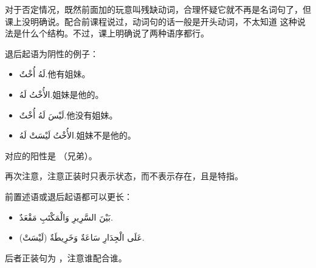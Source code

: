 \begin{note}
    对于否定情况，既然前面加的玩意叫残缺动词，合理怀疑它就不再是名词句了，但课上没明确说。配合前课程说过，动词句的话一般是开头动词，不太知道  这种说法是什么个结构。不过，课上明确说了两种语序都行。
\end{note}

退后起语为阴性的例子：

\begin{itemize}
    \item \ac{لَهُ أُخْتٌ.}{他有姐妹。}
    \item \ac{الأُخْتُ لَهُ.}{姐妹是他的。}
    \item \ac{لَيْسَ لَهُ أُخْتٌ.}{他没有姐妹。}
    \item \ac{الأُخْتُ لَيْسَتْ لَهُ.}{姐妹不是他的。}
\end{itemize}

\begin{attention}
     对应的阳性是  （兄弟）。
\end{attention}

再次注意，注意正装时只表示状态，而不表示存在，且是特指。

前置述语或退后起语都可以更长：

\begin{Arabic}
    \begin{itemize}
        \item بَيْنَ السَّرِيرِ وَالْمَكْتَبِ مَقْعَدٌ.
        \item (لَيْسَتْ) عَلَى الْجِدَارِ سَاعَةٌ وَخَرِيطَةٌ.
    \end{itemize}
\end{Arabic}

后者正装句为  ，注意谁配合谁。